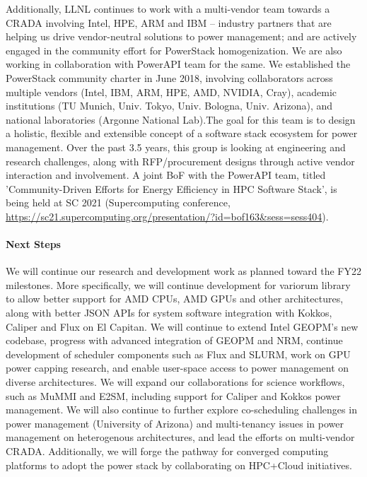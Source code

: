 Additionally, LLNL continues to work with a multi-vendor team towards a CRADA involving Intel, HPE, ARM and IBM -- industry partners that are helping us drive vendor-neutral solutions to power management; and are actively engaged in the community effort for PowerStack homogenization. We are also working in collaboration with PowerAPI team for the same. We established the PowerStack community charter in June 2018, involving collaborators across multiple vendors (Intel, IBM, ARM, HPE, AMD, NVIDIA, Cray), academic institutions (TU Munich, Univ. Tokyo, Univ. Bologna, Univ. Arizona), and national laboratories (Argonne National Lab).The goal for this team is to design a holistic, flexible and extensible concept of a software stack ecosystem for power management. Over the past 3.5 years, this group is looking at engineering and research challenges, along with RFP/procurement designs through active vendor interaction and involvement. A joint BoF with the PowerAPI team, titled 'Community-Driven Efforts for Energy Efficiency in HPC Software Stack',  is being held at SC 2021 (Supercomputing conference, \url{https://sc21.supercomputing.org/presentation/?id=bof163&sess=sess404}). 

\paragraph{Next Steps}
We will continue our research and development work as planned toward the FY22 milestones. More specifically, we will continue development for variorum library to allow better support for AMD CPUs, AMD GPUs and other architectures, along with better JSON APIs for system software integration with Kokkos, Caliper and Flux on El Capitan. We will continue to extend Intel GEOPM's new codebase, progress with advanced integration of GEOPM and NRM, continue development of scheduler components such as Flux and SLURM, work on GPU power capping research, and enable user-space access to power management on diverse architectures. We will expand our collaborations for science workflows, such as MuMMI and E2SM, including support for Caliper and Kokkos power management. We will also continue to further explore co-scheduling challenges in power management (University of Arizona) and multi-tenancy issues in power management on heterogenous architectures, and lead the efforts on multi-vendor CRADA. Additionally, we will forge the pathway for converged computing platforms to adopt the power stack by collaborating on HPC+Cloud initiatives. 
